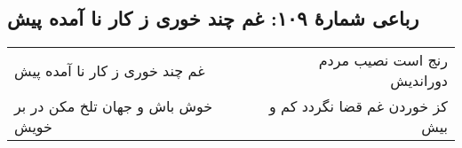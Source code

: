 \begin{center}
\section*{رباعی شمارهٔ ۱۰۹: غم چند خوری ز کار نا آمده پیش}
\label{sec:109}
\begin{longtable}{l p{0.5cm} r}
غم چند خوری ز کار نا آمده پیش
&&
رنج است نصیب مردم دوراندیش
\\
خوش باش و جهان تلخ مکن در بر خویش
&&
کز خوردن غم قضا نگردد کم و بیش
\\
\end{longtable}
\end{center}
